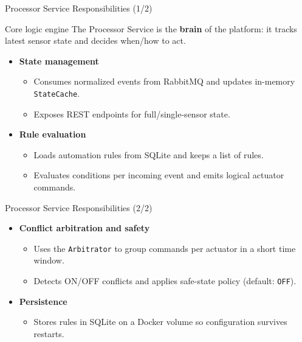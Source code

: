 \documentclass[aspectratio=169]{beamer}
\begin{document}
\begin{frame}[t]{Processor Service Responsibilities (1/2)}
  \begin{block}{Core logic engine}
    The Processor Service is the \textbf{brain} of the platform: it tracks latest sensor state and decides when/how to act.
  \end{block}
  \begin{itemize}
    \item \textbf{State management}
      \begin{itemize}
        \item Consumes normalized events from RabbitMQ and updates in-memory \texttt{StateCache}.
        \item Exposes REST endpoints for full/single-sensor state.
      \end{itemize}
    \item \textbf{Rule evaluation}
      \begin{itemize}
        \item Loads automation rules from SQLite and keeps a list of rules.
        \item Evaluates conditions per incoming event and emits logical actuator commands.
      \end{itemize}
  \end{itemize}
\end{frame}

\begin{frame}[t]{Processor Service Responsibilities (2/2)}
  \begin{itemize}
    \item \textbf{Conflict arbitration and safety}
      \begin{itemize}
        \item Uses the \texttt{Arbitrator} to group commands per actuator in a short time window.
        \item Detects ON/OFF conflicts and applies safe-state policy (default: \texttt{OFF}).
      \end{itemize}
    \item \textbf{Persistence}
      \begin{itemize}
        \item Stores rules in SQLite on a Docker volume so configuration survives restarts.
      \end{itemize}
  \end{itemize}
\end{frame}
\end{document}
